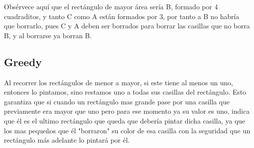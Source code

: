 \documentclass{article}
\begin{document}
Obsérvece aquí que el rectángulo de mayor área sería B, formado por 4 cuadraditos, y tanto C como A están formados por 3, por tanto a B no habría que borrarlo, pues C y A deben ser borrados para borrar las casillas que no borra B, y al borrarse ya borran B.
\subsection{Greedy}
Al recorrer los rectángulos de menor a mayor, si este tiene al menos un uno, entonces lo pintamos, sino restamos uno a todas sus casillas del rectángulo. Esto garantiza que si cuando un rectángulo mas grande pase por una casilla que previamente era mayor que uno pero para ese momento ya su valor es uno, indica que él es el ultimo rectángulo que queda que debería pintar dicha casilla, ya que los mas pequeños que él "borraron" su color de esa casilla con la seguridad que un rectángulo más adelante lo pintará por él.
\end{document}
